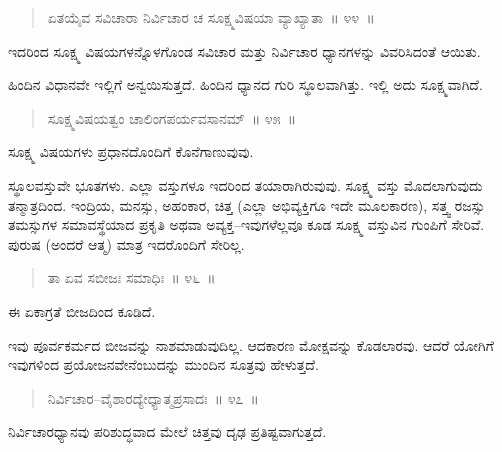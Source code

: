 \vspace{-0.3cm}

\begin{verse}
ಏತಯೈವ ಸವಿಚಾರಾ ನಿರ್ವಿಚಾರ ಚ ಸೂಕ್ಷ್ಮವಿಷಯಾ ವ್ಯಾಖ್ಯಾತಾ~॥ ೪೪~॥
\end{verse}

\vspace{-0.3cm}

ಇದರಿಂದ ಸೂಕ್ಷ್ಮ ವಿಷಯಗಳನ್ನೊಳಗೊಂಡ ಸವಿಚಾರ ಮತ್ತು ನಿರ್ವಿಚಾರ ಧ್ಯಾನಗಳನ್ನು ವಿವರಿಸಿದಂತೆ ಆಯಿತು. 

ಹಿಂದಿನ ವಿಧಾನವೇ ಇಲ್ಲಿಗೆ ಅನ್ವಯಿಸುತ್ತದೆ. ಹಿಂದಿನ ಧ್ಯಾನದ ಗುರಿ ಸ್ಥೂಲವಾಗಿತ್ತು. ಇಲ್ಲಿ ಅದು ಸೂಕ್ಷ್ಮವಾಗಿದೆ. 

\vspace{-0.3cm}

\begin{verse}
ಸೂಕ್ಷ್ಮವಿಷಯತ್ವಂ ಚಾಲಿಂಗಪರ್ಯವಸಾನಮ್​~॥ ೪೫~॥
\end{verse}

\vspace{-0.3cm}

ಸೂಕ್ಷ್ಮ ವಿಷಯಗಳು ಪ್ರಧಾನದೊಂದಿಗೆ ಕೊನೆಗಾಣುವುವು. 

ಸ್ಥೂಲವಸ್ತುವೇ ಭೂತಗಳು. ಎಲ್ಲಾ ವಸ್ತುಗಳೂ ಇದರಿಂದ ತಯಾರಾಗಿರುವುವು. ಸೂಕ್ಷ್ಮ ವಸ್ತು ಮೊದಲಾಗುವುದು ತನ್ಮಾತ್ರದಿಂದ. ಇಂದ್ರಿಯ, ಮನಸ್ಸು, ಅಹಂಕಾರ, ಚಿತ್ತ (ಎಲ್ಲಾ ಅಭಿವ್ಯಕ್ತಿಗೂ ಇದೇ ಮೂಲಕಾರಣ), ಸತ್ತ್ವ ರಜಸ್ಸು ತಮಸ್ಸುಗಳ ಸಮಾವಸ್ಥೆಯಾದ ಪ್ರಕೃತಿ ಅಥವಾ ಅವ್ಯಕ್ತ–ಇವುಗಳೆಲ್ಲವೂ ಕೂಡ ಸೂಕ್ಷ್ಮ ವಸ್ತುವಿನ ಗುಂಪಿಗೆ ಸೇರಿವೆ. ಪುರುಷ (ಅಂದರೆ ಆತ್ಮ) ಮಾತ್ರ ಇದರೊಂದಿಗೆ ಸೇರಿಲ್ಲ.

\vspace{-0.3cm}

\begin{verse}
ತಾ ಏವ ಸಬೀಜಃ ಸಮಾಧಿಃ~॥ ೪೬~॥
\end{verse}

\vspace{-0.3cm}

ಈ ಏಕಾಗ್ರತೆ ಬೀಜದಿಂದ ಕೂಡಿದೆ. 

ಇವು ಪೂರ್ವಕರ್ಮದ ಬೀಜವನ್ನು ನಾಶಮಾಡುವುದಿಲ್ಲ. ಆದಕಾರಣ ಮೋಕ್ಷವನ್ನು ಕೊಡಲಾರವು. ಆದರೆ ಯೋಗಿಗೆ ಇವುಗಳಿಂದ ಪ್ರಯೋಜನವೇನೆಂಬುದನ್ನು ಮುಂದಿನ ಸೂತ್ರವು ಹೇಳುತ್ತದೆ. 

\vspace{-0.3cm}

\begin{verse}
ನಿರ್ವಿಚಾರ–ವೈಶಾರದ್ಯೇಧ್ಯಾತ್ಮಪ್ರಸಾದಃ~॥ ೪೭~॥
\end{verse}

\vspace{-0.3cm}

ನಿರ್ವಿಚಾರಧ್ಯಾನವು ಪರಿಶುದ್ಧವಾದ ಮೇಲೆ ಚಿತ್ತವು ದೃಢ ಪ್ರತಿಷ್ಟವಾಗುತ್ತದೆ. 

\vspace{-0.3cm}


